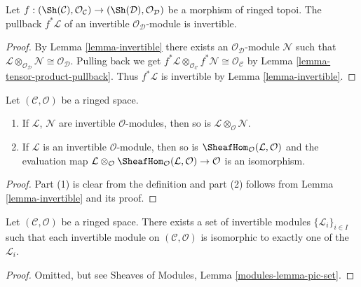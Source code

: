 \begin{lemma}
\label{lemma-pullback-invertible}
Let $f : (\Sh(\mathcal{C}), \mathcal{O}_\mathcal{C}) \to
(\Sh(\mathcal{D}), \mathcal{O}_\mathcal{D})$ be a
morphism of ringed topoi. The pullback $f^*\mathcal{L}$ of an
invertible $\mathcal{O}_\mathcal{D}$-module is invertible.
\end{lemma}

\begin{proof}
By Lemma \ref{lemma-invertible}
there exists an $\mathcal{O}_\mathcal{D}$-module $\mathcal{N}$ such that
$\mathcal{L} \otimes_{\mathcal{O}_\mathcal{D}} \mathcal{N} \cong
\mathcal{O}_\mathcal{D}$. Pulling back we get
$f^*\mathcal{L} \otimes_{\mathcal{O}_\mathcal{C}} f^*\mathcal{N} \cong
\mathcal{O}_\mathcal{C}$
by Lemma \ref{lemma-tensor-product-pullback}.
Thus $f^*\mathcal{L}$ is invertible by Lemma \ref{lemma-invertible}.
\end{proof}

\begin{lemma}
\label{lemma-constructions-invertible}
Let $(\mathcal{C}, \mathcal{O})$ be a ringed space.
\begin{enumerate}
\item If $\mathcal{L}$, $\mathcal{N}$ are invertible
$\mathcal{O}$-modules, then so is
$\mathcal{L} \otimes_\mathcal{O} \mathcal{N}$.
\item If $\mathcal{L}$ is an invertible
$\mathcal{O}$-module, then so is
$\SheafHom_\mathcal{O}(\mathcal{L}, \mathcal{O})$ and the evaluation map
$\mathcal{L} \otimes_\mathcal{O}
\SheafHom_\mathcal{O}(\mathcal{L}, \mathcal{O}) \to \mathcal{O}$
is an isomorphism.
\end{enumerate}
\end{lemma}

\begin{proof}
Part (1) is clear from the definition and part (2) follows from
Lemma \ref{lemma-invertible} and its proof.
\end{proof}

\begin{lemma}
\label{lemma-pic-set}
Let $(\mathcal{C}, \mathcal{O})$ be a ringed space.
There exists a set of invertible modules $\{\mathcal{L}_i\}_{i \in I}$
such that each invertible module on $(\mathcal{C}, \mathcal{O})$
is isomorphic to exactly one of the $\mathcal{L}_i$.
\end{lemma}

\begin{proof}
Omitted, but see Sheaves of Modules, Lemma \ref{modules-lemma-pic-set}.
\end{proof}

